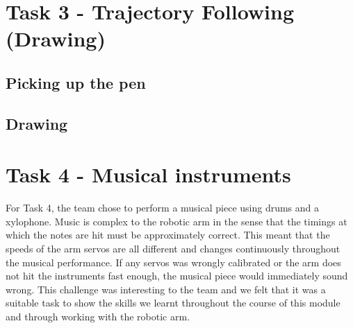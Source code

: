 \documentclass[9pt, a4paper]{article}
\begin{document}



\section{Task 3 - Trajectory Following (Drawing)}

\subsection{Picking up the pen}


\subsection{Drawing}


\section{Task 4 - Musical instruments}

For Task 4, the team chose to perform a musical piece using drums and a
xylophone. Music is complex to the robotic arm in the sense that the timings at
which the notes are hit must be approximately correct. This meant that the
speeds of the arm servos are all different and changes continuously throughout
the musical performance. If any servos was wrongly calibrated or the arm does
not hit the instruments fast enough, the musical piece would immediately sound
wrong. This challenge was interesting to the team and we
felt that it was a suitable task to show the skills we learnt throughout the
course of this module and through working with the robotic arm. 
\end{document}
